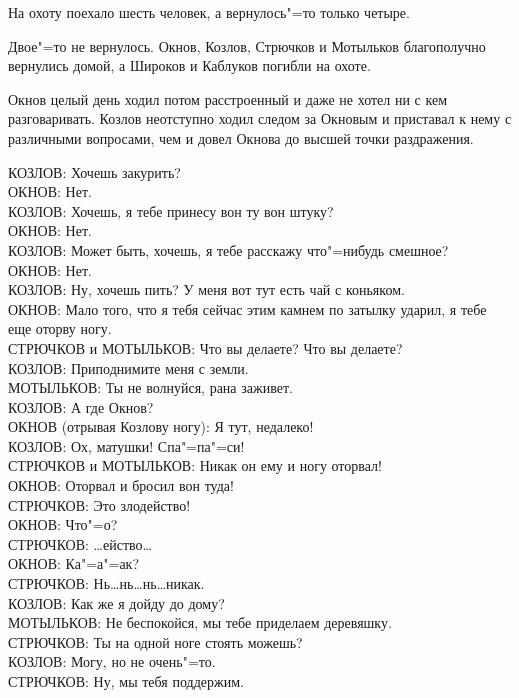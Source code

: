 На охоту поехало шесть человек, а вернулось"=то только четыре. 

Двое"=то не вернулось. Окнов, Козлов, Стрючков и Мотыльков благополучно вернулись домой, а Широков и Каблуков погибли на охоте. 

Окнов целый день ходил потом расстроенный и даже не хотел ни с кем разговаривать. Козлов неотступно ходил следом за Окновым и приставал к нему с различными вопросами, чем и довел Окнова до высшей точки раздражения. 

КОЗЛОВ: Хочешь закурить? \\
ОКНОВ: Нет. \\
КОЗЛОВ: Хочешь, я тебе принесу вон ту вон штуку? \\
ОКНОВ: Нет. \\
КОЗЛОВ: Может быть, хочешь, я тебе расскажу что"=нибудь смешное? \\
ОКНОВ: Нет. \\
КОЗЛОВ: Ну, хочешь пить? У меня вот тут есть чай с коньяком. \\
ОКНОВ: Мало того, что я тебя сейчас этим камнем по затылку ударил, я тебе еще оторву ногу. \\
СТРЮЧКОВ и МОТЫЛЬКОВ: Что вы делаете? Что вы делаете? \\
КОЗЛОВ: Приподнимите меня с земли. \\
МОТЫЛЬКОВ: Ты не волнуйся, рана заживет. \\
КОЗЛОВ: А где Окнов? \\
ОКНОВ (отрывая Козлову ногу): Я тут, недалеко! \\
КОЗЛОВ: Ох, матушки! Спа"=па"=си! \\
СТРЮЧКОВ и МОТЫЛЬКОВ: Никак он ему и ногу оторвал! \\
ОКНОВ: Оторвал и бросил вон туда! \\
СТРЮЧКОВ: Это злодейство! \\
ОКНОВ: Что"=о? \\
СТРЮЧКОВ: \dots ейство\dots \\
ОКНОВ: Ка"=а"=ак? \\
СТРЮЧКОВ: Нь\dots нь\dots нь\dots никак. \\
КОЗЛОВ: Как же я дойду до дому? \\
МОТЫЛЬКОВ: Не беспокойся, мы тебе приделаем деревяшку. \\
СТРЮЧКОВ: Ты на одной ноге стоять можешь? \\
КОЗЛОВ: Могу, но не очень"=то. \\
СТРЮЧКОВ: Ну, мы тебя поддержим. \\
